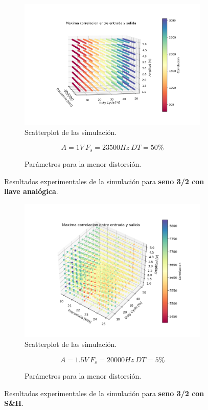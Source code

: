 \begin{figure}[H]
\centering
\begin{subfigure}{\linewidth}
\includegraphics[width=\linewidth]{ImagenesEjercicio6/scatter_llave_sen32.png}
\caption{Scatterplot de las simulación.}
\end{subfigure}

\begin{subfigure}{\linewidth}
\[A = 1V \ F_s = 23500Hz \ DT = 50\%\]
\caption{Parámetros para la menor distorsión.}
\end{subfigure}
\label{sen32_llave}
\caption{Resultados experimentales de la simulación para \textbf{seno 3/2 con llave analógica}.}
\end{figure}

\begin{figure}[H]
\centering
\begin{subfigure}{\linewidth}
\includegraphics[width=\linewidth]{ImagenesEjercicio6/scatter_sh_sen32.png}
\caption{Scatterplot de las simulación.}
\end{subfigure}

\begin{subfigure}{\linewidth}
\[A = 1.5V \ F_s = 20000Hz \ DT = 5\%\]
\caption{Parámetros para la menor distorsión.}
\end{subfigure}
\label{sen32_sh}
\caption{Resultados experimentales de la simulación para \textbf{seno 3/2 con S\&H}.}
\end{figure}

